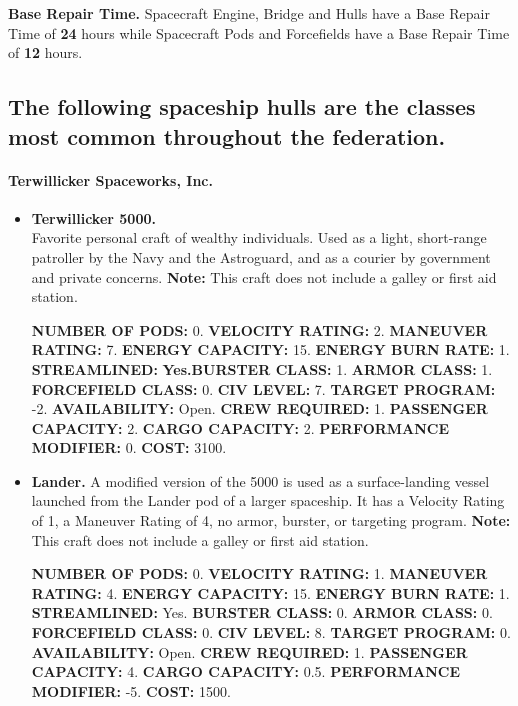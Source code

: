 \textbf{Base Repair Time.} Spacecraft Engine, Bridge and Hulls have a
Base Repair Time of \textbf{24} hours while Spacecraft Pods and
Forcefields have a Base Repair Time of \textbf{12} hours.

\subsection[Spacecraft Hulls]{The following spaceship hulls are the
  classes most common 
  throughout the federation.}
\label{sec:spacecraft-hulls}


\paragraph{Terwillicker Spaceworks, Inc.}
\label{sec:hulls-terwillicker}


\begin{itemize}
\item\textbf{\hypertarget{tag:terwillicker-5000}{Terwillicker 5000}.}\\
  Favorite personal craft of wealthy individuals. Used as a light,
  short-range patroller by the Navy and the Astroguard, and as a
  courier by government and private concerns.  \textbf{Note:} This
  craft does not include a galley or first aid station.

\textbf{NUMBER OF PODS:} 0. \textbf{VELOCITY RATING:} 2.
\textbf{MANEUVER RATING:} 7. \textbf{ENERGY CAPACITY:} 15.
\textbf{ENERGY BURN RATE:} 1. \textbf{STREAMLINED:} \textbf{Yes.BURSTER
  CLASS:} 1. \textbf{ARMOR CLASS:} 1.  \textbf{FORCEFIELD CLASS:} 0.
\textbf{CIV LEVEL:} 7. \textbf{TARGET PROGRAM:} -2.
\textbf{AVAILABILITY:} Open. \textbf{CREW REQUIRED:} 1.
\textbf{PASSENGER CAPACITY:} 2. \textbf{CARGO CAPACITY:} 2.
\textbf{PERFORMANCE MODIFIER:} 0. \textbf{COST:} 3100.

\item\textbf{Lander.}  A modified version of the 5000 is used as a
  surface-landing vessel launched from the Lander pod of a larger
  spaceship. It has a Velocity Rating of 1, a Maneuver Rating of 4, no
  armor, burster, or targeting program.  \textbf{Note:} This craft
  does not include a galley or first aid station.
  
  \textbf{NUMBER OF PODS:} 0. \textbf{VELOCITY RATING:} 1.
  \textbf{MANEUVER RATING:} 4. \textbf{ENERGY CAPACITY:} 15.
  \textbf{ENERGY BURN RATE:} 1. \textbf{STREAMLINED:}
  Yes. \textbf{BURSTER CLASS:} 0. \textbf{ARMOR CLASS:} 0.
  \textbf{FORCEFIELD CLASS:} 0. \textbf{CIV LEVEL:} 8. \textbf{TARGET
    PROGRAM:} 0. \textbf{AVAILABILITY:} Open. \textbf{CREW REQUIRED:} 1.
  \textbf{PASSENGER CAPACITY:} 4. \textbf{CARGO CAPACITY:} 0.5.
  \textbf{PERFORMANCE MODIFIER:} -5. \textbf{COST:} 1500.


\end{itemize}

